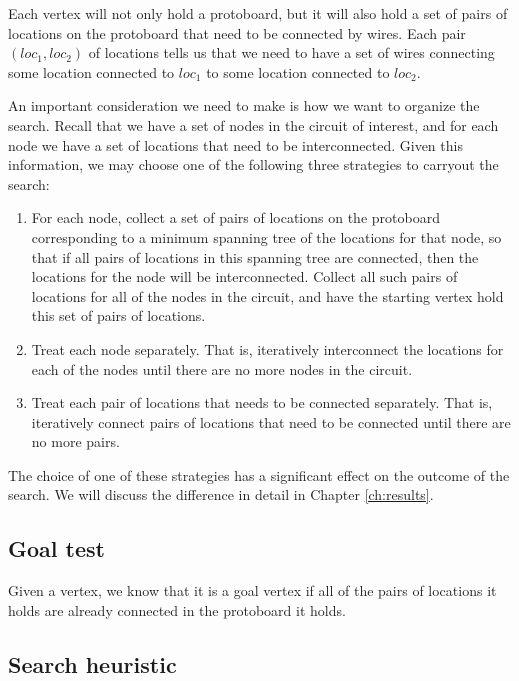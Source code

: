 Each vertex will not only hold a protoboard, but it will also hold a set of
pairs of locations on the protoboard that need to be connected by wires. Each
pair $(loc_1, loc_2)$ of locations tells us that we need to have a set of wires
connecting some location connected to $loc_1$ to some location connected to
$loc_2$.

An important consideration we need to make is how we want to organize the
search. Recall that we have a set of nodes in the circuit of interest, and for
each node we have a set of locations that need to be interconnected. Given this
information, we may choose one of the following three strategies to carryout the
search:

\begin{enumerate}
\item For each node, collect a set of pairs of locations on the protoboard
corresponding to a minimum spanning tree of the locations for that node, so that
if all pairs of locations in this spanning tree are connected, then the
locations for the node will be interconnected. Collect all such pairs of
locations for all of the nodes in the circuit, and have the starting vertex hold
this set of pairs of locations.
\item Treat each node separately. That is, iteratively interconnect the
locations for each of the nodes until there are no more nodes in the circuit.
\item Treat each pair of locations that needs to be connected separately. That
is, iteratively connect pairs of locations that need to be connected until there
are no more pairs.
\end{enumerate}

The choice of one of these strategies has a significant effect on the outcome of
the search. We will discuss the difference in detail in Chapter
\ref{ch:results}.

\subsection{Goal test}

Given a vertex, we know that it is a goal vertex if all of the pairs of
locations it holds are already connected in the protoboard it holds.

\subsection{Search heuristic}


